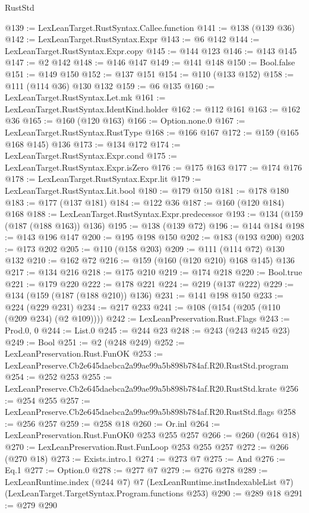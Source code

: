 \begin{lexlean}{RustStd}
\begin{coremodule}
@139 := LexLeanTarget.RustSyntax.Callee.function
@141 := @138 (@139 @36)
@142 := LexLeanTarget.RustSyntax.Expr
@143 := @6 @142
@144 := LexLeanTarget.RustSyntax.Expr.copy
@145 := @144 @123
@146 := @143 @145
@147 := @2 @142
@148 := @146 @147
@149 := @141 @148
@150 := Bool.false
@151 := @149 @150
@152 := @137 @151
@154 := @110 (@133 @152)
@158 := @111 (@114 @36) @130 @132
@159 := @6 @135
@160 := LexLeanTarget.RustSyntax.Let.mk
@161 := LexLeanTarget.RustSyntax.IdentKind.holder
@162 := @112 @161
@163 := @162 @36
@165 := @160 (@120 @163)
@166 := Option.none.{0}
@167 := LexLeanTarget.RustSyntax.RustType
@168 := @166 @167
@172 := @159 (@165 @168 @145) @136
@173 := @134 @172
@174 := LexLeanTarget.RustSyntax.Expr.cond
@175 := LexLeanTarget.RustSyntax.Expr.isZero
@176 := @175 @163
@177 := @174 @176
@178 := LexLeanTarget.RustSyntax.Expr.lit
@179 := LexLeanTarget.RustSyntax.Lit.bool
@180 := @179 @150
@181 := @178 @180
@183 := @177 (@137 @181)
@184 := @122 @36
@187 := @160 (@120 @184) @168
@188 := LexLeanTarget.RustSyntax.Expr.predecessor
@193 := @134 (@159 (@187 (@188 @163)) @136)
@195 := @138 (@139 @72)
@196 := @144 @184
@198 := @143 @196 @147
@200 := @195 @198 @150
@202 := @183 (@193 @200)
@203 := @173 @202
@205 := @110 (@158 @203)
@209 := @111 (@114 @72) @130 @132
@210 := @162 @72
@216 := @159 (@160 (@120 @210) @168 @145) @136
@217 := @134 @216
@218 := @175 @210
@219 := @174 @218
@220 := Bool.true
@221 := @179 @220
@222 := @178 @221
@224 := @219 (@137 @222)
@229 := @134 (@159 (@187 (@188 @210)) @136)
@231 := @141 @198 @150
@233 := @224 (@229 @231)
@234 := @217 @233
@241 := @108 (@154 (@205 (@110 (@209 @234) (@2 @109))))
@242 := LexLeanPreservation.Rust.Flags
@243 := Prod.{0, 0}
@244 := List.{0}
@245 := @244 @23
@248 := @243 (@243 @245 @23)
@249 := Bool
@251 := @2 (@248 @249)
@252 := LexLeanPreservation.Rust.FunOK
@253 := LexLeanPreserve.Cb2e645daebca2a99ae99a5b898b784af.R20.RustStd.program
@254 := @252 @253
@255 := LexLeanPreserve.Cb2e645daebca2a99ae99a5b898b784af.R20.RustStd.krate
@256 := @254 @255
@257 := LexLeanPreserve.Cb2e645daebca2a99ae99a5b898b784af.R20.RustStd.flags
@258 := @256 @257
@259 := @258 @18
@260 := Or.inl
@264 := LexLeanPreservation.Rust.FunOK0 @253 @255 @257
@266 := @260 (@264 @18)
@270 := LexLeanPreservation.Rust.FunLoop @253 @255 @257
@272 := @266 (@270 @18)
@273 := Exists.intro.{1}
@274 := @273 @7
@275 := And
@276 := Eq.{1}
@277 := Option.{0}
@278 := @277 @7
@279 := @276 @278
@289 := LexLeanRuntime.index
    (@244 @7)
    @7
    (LexLeanRuntime.instIndexableList @7)
    (LexLeanTarget.TargetSyntax.Program.functions @253)
@290 := @289 @18
@291 := @279 @290

\end{coremodule}
\end{lexlean}
